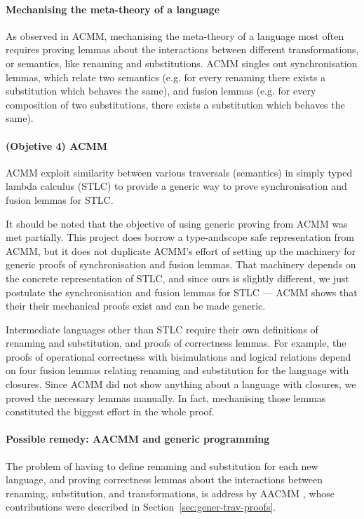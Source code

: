 \documentclass[bsc,frontabs,oneside,singlespacing,parskip,deptreport]{infthesis}
\theoremstyle{definition}
\theoremstyle{lemma}
\begin{document}
\paragraph{Mechanising the meta-theory of a language}
As observed in ACMM, mechanising the meta-theory of a language most
often requires proving lemmas about the interactions between different
transformations, or semantics, like renaming and substitutions. ACMM
singles out synchronisation lemmas, which relate two semantics
(e.g. for every renaming there exists a substitution which behaves the
same), and fusion lemmas (e.g. for every composition of two
substitutions, there exists a substitution which behaves the
same). 

\paragraph{(Objetive 4) ACMM}
ACMM exploit similarity between various traversals (semantics) in
simply typed lambda calculus (STLC) to provide a generic way to
prove synchronisation and fusion lemmas for STLC.

It should be noted that the objective of using generic proving from
ACMM was met partially. This project does borrow a type-andscope safe
representation from ACMM, but it does not duplicate ACMM's effort of
setting up the machinery for generic proofs of synchronisation and
fusion lemmas. That machinery depends on the concrete representation
of STLC, and since ours is slightly different, we just postulate the
synchronisation and fusion lemmas for STLC --- ACMM shows that their
their mechanical proofs exist and can be made generic.

Intermediate languages other than STLC require their own definitions
of renaming and substitution, and proofs of correctness lemmas. For
example, the proofs of operational correctness with bisimulations and
logical relations depend on four fusion lemmas relating renaming and
substitution for the language with closures. Since ACMM did not show
anything about a language with closures, we proved the necessary
lemmas manually. In fact, mechanising those lemmas constituted the
biggest effort in the whole proof.

\paragraph{Possible remedy: AACMM and generic programming}
The problem of having to define renaming and substitution for each new
language, and proving correctness lemmas about the interactions
between renaming, substitution, and transformations, is address by
AACMM \cite{DBLP:journals/pacmpl/AllaisA0MM18}, whose contributions
were described in Section~\ref{sec:gener-trav-proofs}.
\end{document}
